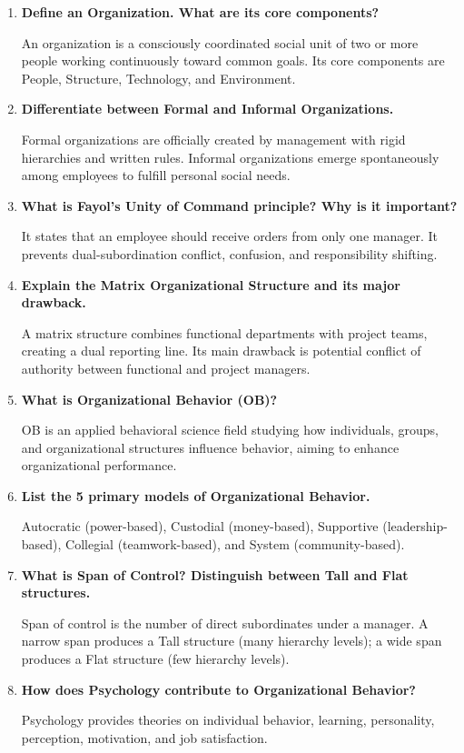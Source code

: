 \documentclass[12pt,a4paper]{article}
\newcommand{\Q}[1]{\textbf{#1}\par\noindent\ignorespaces}
\begin{document}
\begin{tcolorbox}[exambox, title={\textbf{Frequently Asked / Viva Questions}}]
\begin{enumerate}[leftmargin=*, itemsep=4pt]
  \item \Q{Define an Organization. What are its core components?}
    An organization is a consciously coordinated social unit of two or more people working continuously toward common goals. Its core components are People, Structure, Technology, and Environment.
  
  \item \Q{Differentiate between Formal and Informal Organizations.}
    Formal organizations are officially created by management with rigid hierarchies and written rules. Informal organizations emerge spontaneously among employees to fulfill personal social needs.
  
  \item \Q{What is Fayol's Unity of Command principle? Why is it important?}
    It states that an employee should receive orders from only one manager. It prevents dual-subordination conflict, confusion, and responsibility shifting.
  
  \item \Q{Explain the Matrix Organizational Structure and its major drawback.}
    A matrix structure combines functional departments with project teams, creating a dual reporting line. Its main drawback is potential conflict of authority between functional and project managers.
  
  \item \Q{What is Organizational Behavior (OB)?}
    OB is an applied behavioral science field studying how individuals, groups, and organizational structures influence behavior, aiming to enhance organizational performance.
  
  \item \Q{List the 5 primary models of Organizational Behavior.}
    Autocratic (power-based), Custodial (money-based), Supportive (leadership-based), Collegial (teamwork-based), and System (community-based).
  
  \item \Q{What is Span of Control? Distinguish between Tall and Flat structures.}
    Span of control is the number of direct subordinates under a manager. A narrow span produces a Tall structure (many hierarchy levels); a wide span produces a Flat structure (few hierarchy levels).
  
  \item \Q{How does Psychology contribute to Organizational Behavior?}
    Psychology provides theories on individual behavior, learning, personality, perception, motivation, and job satisfaction.
  

\end{enumerate}
\end{tcolorbox}
\end{document}
